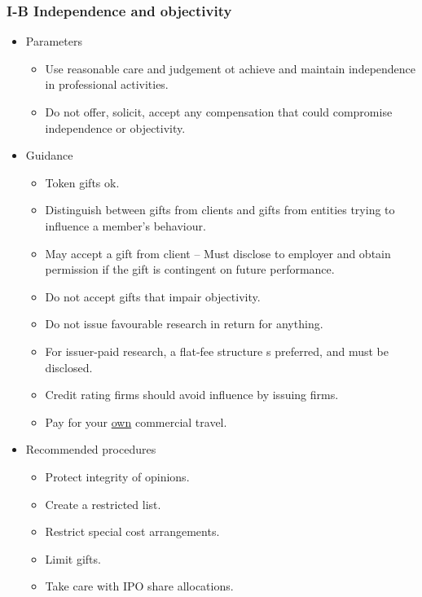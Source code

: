 \documentclass[../notes_compiled.tex]{subfiles}
\begin{document}
\subsubsection{I-B Independence and objectivity}
\begin{itemize}
\item Parameters
\begin{itemize}
\item Use reasonable care and judgement ot achieve and maintain independence in professional activities.
\item Do not offer, solicit, accept any compensation that could compromise independence or objectivity.
\end{itemize}
\item Guidance
\begin{itemize}
\item Token gifts ok.
\item Distinguish between gifts from clients and gifts from entities trying to influence a member’s behaviour.
\item May accept a gift from client -- Must disclose to employer and obtain permission if the gift is contingent on future performance.
\item Do not accept gifts that impair objectivity.
\item Do not issue favourable research in return for anything.
\item For issuer-paid research, a flat-fee structure s preferred, and must be disclosed.
\item Credit rating firms should avoid influence by issuing firms.
\item Pay for your \underline{own} commercial travel.
\end{itemize}
\item Recommended procedures
\begin{itemize}
\item Protect integrity of opinions.
\item Create a restricted list.
\item Restrict special cost arrangements.
\item Limit gifts.
\item Take care with IPO share allocations.
\end{itemize}
\end{itemize}
\end{document}
